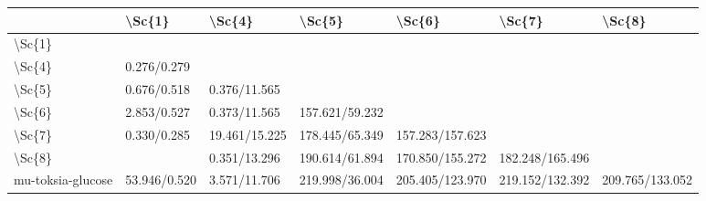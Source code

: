 \begin{tabular}{lllllll}
\toprule
{} &        \textbackslash Sc\{1\} &         \textbackslash Sc\{4\} &          \textbackslash Sc\{5\} &           \textbackslash Sc\{6\} &           \textbackslash Sc\{7\} &           \textbackslash Sc\{8\} \\
\midrule
\textbackslash Sc\{1\}            &               &                &                 &                  &                  &                  \\
\textbackslash Sc\{4\}            &   0.276/0.279 &                &                 &                  &                  &                  \\
\textbackslash Sc\{5\}            &   0.676/0.518 &   0.376/11.565 &                 &                  &                  &                  \\
\textbackslash Sc\{6\}            &   2.853/0.527 &   0.373/11.565 &  157.621/59.232 &                  &                  &                  \\
\textbackslash Sc\{7\}            &   0.330/0.285 &  19.461/15.225 &  178.445/65.349 &  157.283/157.623 &                  &                  \\
\textbackslash Sc\{8\}            &               &   0.351/13.296 &  190.614/61.894 &  170.850/155.272 &  182.248/165.496 &                  \\
mu-toksia-glucose &  53.946/0.520 &   3.571/11.706 &  219.998/36.004 &  205.405/123.970 &  219.152/132.392 &  209.765/133.052 \\
\bottomrule
\end{tabular}
